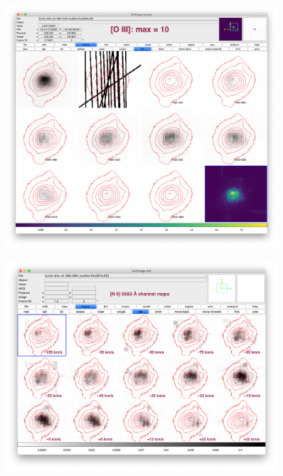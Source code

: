 \documentclass[useAMS, usenatbib]{mnras}
\begin{document}
\begin{figure}[!t]
\centering
\includegraphics[width=0.9\textwidth]{turtle-oiii-bright.png}
  \caption{  }
\end{figure}

\begin{figure}[!t]
\centering
\includegraphics[width=0.9\textwidth]{nii-will.png}
  \caption{  }
\end{figure}
\end{document}
